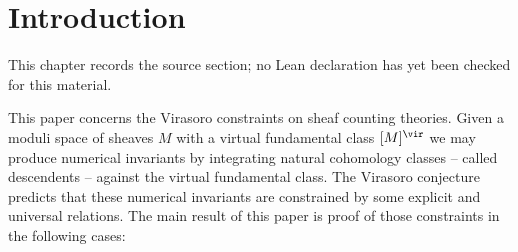 \chapter{Introduction}
\label{virasoro-constraints-moduli-sheaves-vertex-algebras-chapter-01}

\begin{remark}
\label{virasoro-constraints-moduli-sheaves-vertex-algebras-chapter-01-source}
This chapter records the source section; no Lean declaration has yet been checked for this material.
\notready
\end{remark}

This paper concerns the Virasoro constraints on sheaf counting theories. Given a moduli space of sheaves $M$ with a virtual fundamental class $[M]^\vir$ we may produce numerical invariants by integrating natural cohomology classes -- called descendents -- against the virtual fundamental class. The Virasoro conjecture predicts that these numerical invariants are constrained by some explicit and universal relations. The main result of this paper is proof of those constraints in the following cases:

